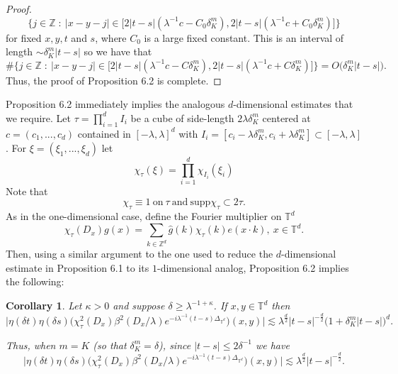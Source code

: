 \documentclass[11pt]{amsart}
\numberwithin{equation}{section}
\newcommand{\la}{\lambda}
\newcommand{\Z}[1][]{\mathbb{Z}^#1}
\newcommand{\T}[1][]{\mathbb{T}^#1}
\newcommand{\laplac}[1]{\Delta_{#1}}
\newcommand{\dK}[1]{\delta_{K}^{#1}}
\newtheorem{corollary}{Corollary}[theorem]
\begin{document}
\begin{proof}
\begin{equation}
    \{ j \in \Z{} \ : \ |x- y - j|\in \big[2|t-s|(\la^{-1}c - C_0\dK{m}), 2|t-s|(\la^{-1}c + C_0\dK{m})\big] \}
\end{equation}  
for fixed $x,y,t$ and $s$, where $C_0$ is a large fixed constant. This is an interval of length $\sim \dK{m}|t-s|$ so we have that
\begin{equation}
    \#\{ j \in \Z{} \ : \ |x- y - j|\in \big[2|t-s|(\la^{-1}c - C\dK{m}), 2|t-s|(\la^{-1}c + C\dK{m})\big] \} = O\big(\dK{m}|t-s|\big).
\end{equation} Thus, the proof of Proposition 6.2 is complete.
\end{proof}

Proposition 6.2 immediately implies the analogous $d$-dimensional estimates that we require. Let $\tau = \prod_{i = 1}^d I_i$ be a cube of side-length $2\la \dK{m}$ centered at $c = (c_1,...,c_d)$ contained in $[-\la, \la]^{d}$ with $I_i = [c_i - \la \dK{m}, c_i + \la \dK{m}]\subset [-\la, \la]$. For $\xi = (\xi_1,...,\xi_d)$ let
\begin{equation}
    \chi_{\tau}(\xi) = \prod_{i=1}^{d}\chi_{I_i}(\xi_i)
\end{equation}
Note that 
\begin{equation}
    \chi_{\tau} \equiv 1 \ \text{on} \ \tau \ \text{and} \ \text{supp}\chi_{\tau} \subset 2\tau.
\end{equation}
As in the one-dimensional case, define the Fourier multiplier on $\T{d}$
\begin{equation}
    \chi_{\tau}(D_x)g(x) = \sum_{k \in \Z{d}}\widehat{g}(k)\chi_{\tau}(k)e(x \cdot k), \ x \in \T{d}.
\end{equation}
Then, using a similar argument to the one used to reduce the $d$-dimensional estimate in Proposition 6.1 to its $1$-dimensional analog, Proposition 6.2 implies the following:
\begin{corollary}
    Let $\kappa > 0$ and suppose $\delta \geq \la^{-1 + \kappa}$. If $x,y \in \T{d}$ then
    \begin{equation}
        \big|\eta(\delta t)\eta(\delta s)\big( \chi_{\tau}^{2}(D_x)\beta^2(D_x / \la)e^{-i\la^{-1}(t-s)\laplac{\T{d}}} \big)(x,y)\big| \lesssim \la^{\frac{d}{2}}|t-s|^{-\frac{d}{2}}\big(1 + \dK{m}|t-s|\big)^d.
    \end{equation}

Thus, when $m = K$ (so that $\dK{m} = \delta$), since $|t-s| \leq 2\delta^{-1}$ we have 
\begin{equation}
    \big|\eta(\delta t)\eta(\delta s)\big( \chi_{\tau}^{2}(D_x)\beta^2(D_x / \la)e^{-i\la^{-1}(t-s)\laplac{\T{d}}} \big)(x,y) \big| \lesssim \la^{\frac{d}{2}}|t-s|^{-\frac{d}{2}}.
\end{equation}
\end{corollary}
\end{document}
